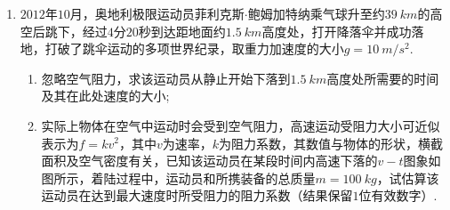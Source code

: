 \begin{enumerate}[leftmargin=0em]



\item 
{}
$ 2012 $年$ 10 $月，奥地利极限运动员菲利克斯$ \cdot $鲍姆加特纳乘气球升至约$ 39 \ km $的高空后跳下，经过$ 4 $分$ 20 $秒到达距地面约$ 1.5 \ km $高度处，打开降落伞并成功落地，打破了跳伞运动的多项世界纪录，取重力加速度的大小$ g=10 \ m/s^{2} $.

\begin{enumerate}
\renewcommand{\labelenumi}{\arabic{enumi}.}
\item
忽略空气阻力，求该运动员从静止开始下落到$ 1.5 \ km $高度处所需要的时间及其在此处速度的大小;
\item 
实际上物体在空气中运动时会受到空气阻力，高速运动受阻力大小可近似表示为$ f=kv^{2} $，其中$ v $为速率，$ k $为阻力系数，其数值与物体的形状，横截面积及空气密度有关，已知该运动员在某段时间内高速下落的$ v-t $图象如图所示，着陆过程中，运动员和所携装备的总质量$ m=100 \ kg $，试估算该运动员在达到最大速度时所受阻力的阻力系数（结果保留$ 1 $位有效数字）.



\end{enumerate}
\begin{figure}[h!]
\flushright

\end{figure}

\end{enumerate}
